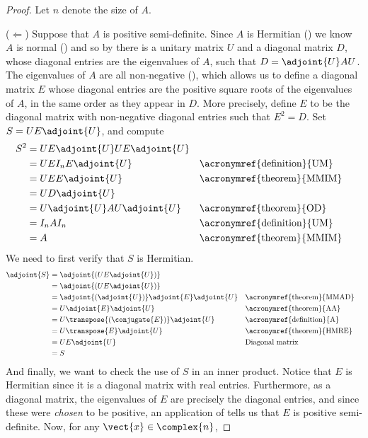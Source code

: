 \begin{proof}
Let $n$ denote the size of $A$.\par
%
($\Leftarrow$) 
Suppose that $A$ is positive semi-definite.  Since $A$ is Hermitian () we know $A$ is normal () and so by  there is a unitary matrix $U$ and a diagonal matrix $D$, whose diagonal entries are the eigenvalues of $A$, such that $D=\adjoint{U}AU$.  The eigenvalues of $A$ are all non-negative (), which allows us to define a diagonal matrix $E$ whose diagonal entries are the positive square roots of the eigenvalues of $A$, in the same order as they appear in $D$.  More precisely, define $E$ to be the diagonal matrix with non-negative diagonal entries such that $E^2=D$.  Set $S=UE\adjoint{U}$, and compute
%
\begin{align*}
S^2
&=UE\adjoint{U}UE\adjoint{U}\\
&=UEI_nE\adjoint{U}&&\text{\acronymref{definition}{UM}}\\
&=UEE\adjoint{U}&&\text{\acronymref{theorem}{MMIM}}\\
&=UD\adjoint{U}\\
&=U\adjoint{U}AU\adjoint{U}&&\text{\acronymref{theorem}{OD}}\\
&=I_nAI_n&&\text{\acronymref{definition}{UM}}\\
&=A&&\text{\acronymref{theorem}{MMIM}}
\end{align*}
%
We need to first verify that $S$ is Hermitian.
%
\begin{align*}
\adjoint{S}
&=\adjoint{\left(UE\adjoint{U}\right)}\\
&=\adjoint{\left(UE\adjoint{U}\right)}\\
&=\adjoint{\left(\adjoint{U}\right)}\adjoint{E}\adjoint{U}&&\text{\acronymref{theorem}{MMAD}}\\
&=U\adjoint{E}\adjoint{U}&&\text{\acronymref{theorem}{AA}}\\
&=U\transpose{\left(\conjugate{E}\right)}\adjoint{U}&&\text{\acronymref{definition}{A}}\\
&=U\transpose{E}\adjoint{U}&&\text{\acronymref{theorem}{HMRE}}\\
&=UE\adjoint{U}&&\text{Diagonal matrix}\\
&=S
\end{align*}
%
And finally, we want to check the use of $S$ in an inner product.    Notice that $E$ is Hermitian since it is a diagonal matrix with real entries.  Furthermore, as a diagonal matrix, the eigenvalues of $E$ are precisely the diagonal entries, and since these were {\em chosen} to be positive, an application of  tells us that $E$ is positive semi-definite.  Now, for any $\vect{x}\in\complex{n}$,  

\end{proof}
